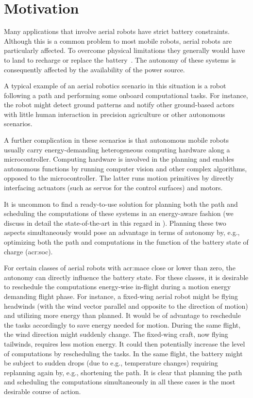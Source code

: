 \section{Motivation}
\label{sec:motivation}

Many applications that involve aerial robots have strict battery constraints. Although this is a common problem to most mobile robots, aerial robots are particularly affected. To overcome physical limitations they generally would have to land to recharge or replace the battery~\citep{zamanakos2020energy}. The autonomy of these systems is consequently affected by the availability of the power source. 

A typical example of an aerial robotics scenario in this situation is a robot following a path and performing some onboard computational tasks. For instance, the robot might detect ground patterns and notify other ground-based actors with little human interaction in precision agriculture or other autonomous scenarios.

A further complication in these scenarios is that autonomous mobile robots usually carry energy-demanding heterogeneous computing hardware along a microcontroller. Computing hardware is involved in the planning and enables autonomous functions by running computer vision and other complex algorithms, opposed to the microcontroller. The latter runs motion primitives by directly interfacing actuators (such as servos for the control surfaces) and motors.

It is uncommon to find a ready-to-use solution for planning both the path and scheduling the computations of these systems in an energy-aware fashion (we discuss in detail the state-of-the-art in this regard in ). Planning these two aspects simultaneously would pose an advantage in terms of autonomy by, e.g., optimizing both the path and computations in the function of the battery state of charge (\Gls{acr:soc}). 

For certain classes of aerial robots with \Gls{acr:mace} close or lower than zero, the autonomy can directly influence the battery state. For these classes, it is desirable to reschedule the computations energy-wise in-flight during a motion energy demanding flight phase. For instance, a fixed-wing aerial robot might be flying headwinds (with the wind vector parallel and opposite to the direction of motion) and utilizing more energy than planned. It would be of advantage to reschedule the tasks accordingly to save energy needed for motion. During the same flight, the wind direction might suddenly change. The fixed-wing craft, now flying tailwinds, requires less motion energy. It could then potentially increase the level of computations by rescheduling the tasks. In the same flight, the battery might be subject to sudden drops (due to e.g., temperature changes) requiring replanning again by, e.g., shortening the path. It is clear that planning the path and scheduling the computations simultaneously in all these cases is the most desirable course of action.

